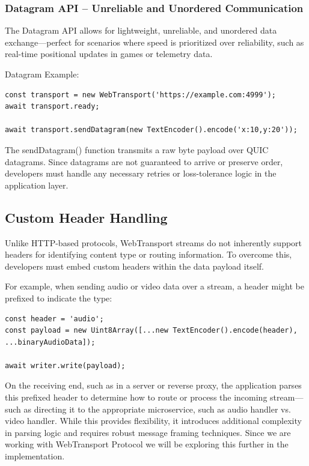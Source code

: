 \subsubsection{Datagram API – Unreliable and Unordered Communication}

The Datagram API allows for lightweight, unreliable, and unordered data exchange—perfect for scenarios where speed is prioritized over reliability, such as real-time positional updates in games or telemetry data.

Datagram Example:

\begin{verbatim}
const transport = new WebTransport('https://example.com:4999');
await transport.ready;

await transport.sendDatagram(new TextEncoder().encode('x:10,y:20'));
\end{verbatim}

The sendDatagram() function transmits a raw byte payload over QUIC datagrams. Since datagrams are not guaranteed to arrive or preserve order, developers must handle any necessary retries or loss-tolerance logic in the application layer.

\subsection{Custom Header Handling}

Unlike HTTP-based protocols, WebTransport streams do not inherently support headers for identifying content type or routing information. To overcome this, developers must embed custom headers within the data payload itself.

For example, when sending audio or video data over a stream, a header might be prefixed to indicate the type:

\begin{verbatim}
const header = 'audio';
const payload = new Uint8Array([...new TextEncoder().encode(header), ...binaryAudioData]);

await writer.write(payload);
\end{verbatim}

On the receiving end, such as in a server or reverse proxy, the application parses this prefixed header to determine how to route or process the incoming stream—such as directing it to the appropriate microservice, such as audio handler vs. video handler. While this provides flexibility, it introduces additional complexity in parsing logic and requires robust message framing techniques. Since we are working with WebTransport Protocol we will be exploring this further in the implementation.


